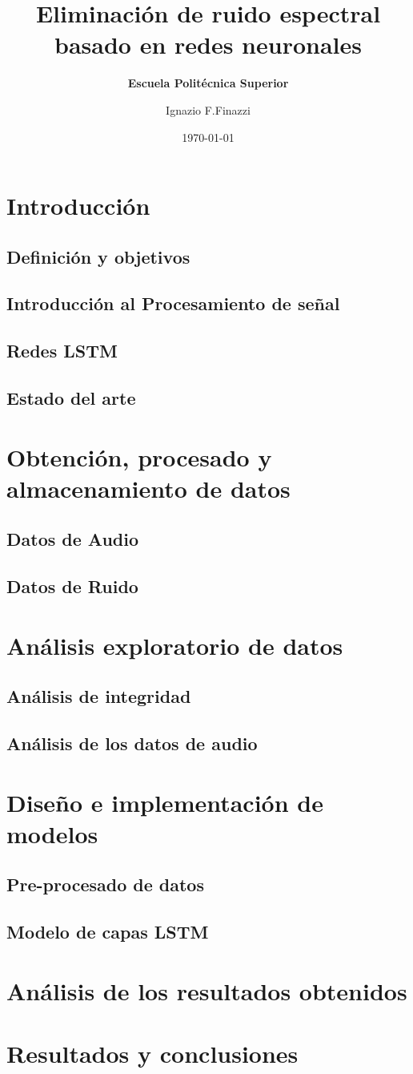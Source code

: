 \documentclass[10pt]{beamer}
\title[] %
{ %
      \textbf{Eliminación de ruido espectral basado en redes neuronales}
}
\subtitle[Escuela Politécnica Superior]
{
      \textbf{Escuela Politécnica Superior}
}
\author[Ignazio F.Finazzi]
{      Ignazio F.Finazzi \\
      {}
}
\institute[]
{
      Escuela Politécnica Superior\\
      Universidad Europea Miguel de Cervantes\\
  
}
\date{\today}
\begin{document}
	
	
	\scriptsize
	\section{Introducción}
		\subsection{Definición y objetivos}
			
		\subsection{Introducción al Procesamiento de señal}
		\subsection{Redes LSTM}
		\subsection{Estado del arte}
	\section{Obtención, procesado y almacenamiento de datos}
		\subsection{Datos de Audio}
		\subsection{Datos de Ruido}
	\section{Análisis exploratorio de datos}
		\subsection{Análisis de integridad}
		\subsection{Análisis de los datos de audio}
	\section{Diseño e implementación de modelos}
		\subsection{Pre-procesado de datos}
		\subsection{Modelo de capas LSTM}
	\section{Análisis de los resultados obtenidos}
	\section{Resultados y conclusiones}
	
	
\end{document}
